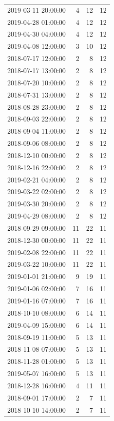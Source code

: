 \begin{tabular}{lrrr}
2019-03-11 20:00:00 & 4 & 12 & 12 \\
2019-04-28 01:00:00 & 4 & 12 & 12 \\
2019-04-30 04:00:00 & 4 & 12 & 12 \\
2019-04-08 12:00:00 & 3 & 10 & 12 \\
2018-07-17 12:00:00 & 2 & 8 & 12 \\
2018-07-17 13:00:00 & 2 & 8 & 12 \\
2018-07-20 10:00:00 & 2 & 8 & 12 \\
2018-07-31 13:00:00 & 2 & 8 & 12 \\
2018-08-28 23:00:00 & 2 & 8 & 12 \\
2018-09-03 22:00:00 & 2 & 8 & 12 \\
2018-09-04 11:00:00 & 2 & 8 & 12 \\
2018-09-06 08:00:00 & 2 & 8 & 12 \\
2018-12-10 00:00:00 & 2 & 8 & 12 \\
2018-12-16 22:00:00 & 2 & 8 & 12 \\
2019-02-21 04:00:00 & 2 & 8 & 12 \\
2019-03-22 02:00:00 & 2 & 8 & 12 \\
2019-03-30 20:00:00 & 2 & 8 & 12 \\
2019-04-29 08:00:00 & 2 & 8 & 12 \\
2018-09-29 09:00:00 & 11 & 22 & 11 \\
2018-12-30 00:00:00 & 11 & 22 & 11 \\
2019-02-08 22:00:00 & 11 & 22 & 11 \\
2019-03-22 10:00:00 & 11 & 22 & 11 \\
2019-01-01 21:00:00 & 9 & 19 & 11 \\
2019-01-06 02:00:00 & 7 & 16 & 11 \\
2019-01-16 07:00:00 & 7 & 16 & 11 \\
2018-10-10 08:00:00 & 6 & 14 & 11 \\
2019-04-09 15:00:00 & 6 & 14 & 11 \\
2018-09-19 11:00:00 & 5 & 13 & 11 \\
2018-11-08 07:00:00 & 5 & 13 & 11 \\
2018-11-28 01:00:00 & 5 & 13 & 11 \\
2019-05-07 16:00:00 & 5 & 13 & 11 \\
2018-12-28 16:00:00 & 4 & 11 & 11 \\
2018-09-01 17:00:00 & 2 & 7 & 11 \\
2018-10-10 14:00:00 & 2 & 7 & 11 \\

\end{tabular}

